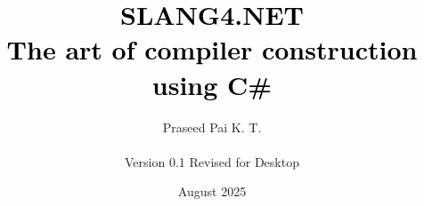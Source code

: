 \documentclass[openany,12pt]{book}
\begin{document}
\title{
    \textcolor{black}{SLANG4.NET} \\[6pt]
    \Large \textnormal{\textcolor{black}{The art of compiler construction using C\#}}
}
\author{Praseed Pai K. T. \\\\[6pt] Version 0.1 Revised for Desktop}
\date{August 2025}
\maketitle

\tableofcontents
\newpage

\mainmatter







\end{document}
